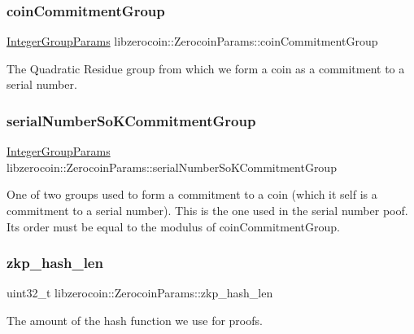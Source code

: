 \subsubsection{\texorpdfstring{coin\+Commitment\+Group}{coinCommitmentGroup}}
{\footnotesize\ttfamily \mbox{\hyperlink{classlibzerocoin_1_1_integer_group_params}{Integer\+Group\+Params}} libzerocoin\+::\+Zerocoin\+Params\+::coin\+Commitment\+Group}

The Quadratic Residue group from which we form a coin as a commitment to a serial number. \mbox{\label{classlibzerocoin_1_1_zerocoin_params_a6360b02f49690260136fe79d85914dcc}} 
\subsubsection{\texorpdfstring{serial\+Number\+So\+K\+Commitment\+Group}{serialNumberSoKCommitmentGroup}}
{\footnotesize\ttfamily \mbox{\hyperlink{classlibzerocoin_1_1_integer_group_params}{Integer\+Group\+Params}} libzerocoin\+::\+Zerocoin\+Params\+::serial\+Number\+So\+K\+Commitment\+Group}

One of two groups used to form a commitment to a coin (which it self is a commitment to a serial number). This is the one used in the serial number poof. It\textquotesingle{}s order must be equal to the modulus of coin\+Commitment\+Group. \mbox{\label{classlibzerocoin_1_1_zerocoin_params_a76d6a2e590469d3e07200aa0f4b5ddef}} 
\subsubsection{\texorpdfstring{zkp\+\_\+hash\+\_\+len}{zkp\_hash\_len}}
{\footnotesize\ttfamily uint32\+\_\+t libzerocoin\+::\+Zerocoin\+Params\+::zkp\+\_\+hash\+\_\+len}

The amount of the hash function we use for proofs. \mbox{\label{classlibzerocoin_1_1_zerocoin_params_a9bdd86029187d93275c5362ff858b81c}} 
